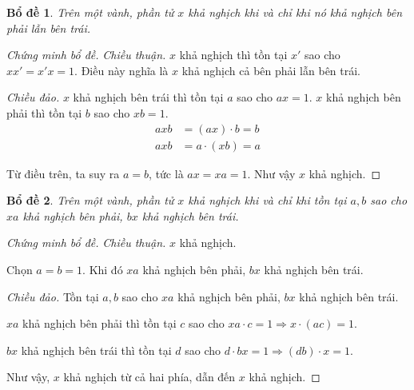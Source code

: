 \documentclass[class=linearalgebra,crop=false]{standalone}
\newtheorem{lemma}{Bổ đề}
\begin{document}
\begin{lemma}Trên một vành, phần tử $x$ khả nghịch khi và chỉ khi nó khả nghịch bên phải lẫn bên trái.
\end{lemma}

\begin{proof}[Chứng minh bổ đề]\textit{Chiều thuận.} $x$ khả nghịch thì tồn tại $x'$ sao cho $xx' = x'x = 1$. Điều này nghĩa là $x$ khả nghịch cả bên phải lẫn bên trái.
    \par\textit{Chiều đảo.} $x$ khả nghịch bên trái thì tồn tại $a$ sao cho $ax = 1$. $x$ khả nghịch bên phải thì tồn tại $b$ sao cho $xb = 1$.
    \begin{align*}
        axb &= (ax)\cdot b = b \\
        axb &= a\cdot (xb) = a
    \end{align*}
    \par Từ điều trên, ta suy ra $a = b$, tức là $ax = xa = 1$. Như vậy $x$ khả nghịch.
\end{proof}

\begin{lemma}Trên một vành, phần tử $x$ khả nghịch khi và chỉ khi tồn tại $a, b$ sao cho $xa$ khả nghịch bên phải, $bx$ khả nghịch bên trái.
\end{lemma}

\begin{proof}[Chứng minh bổ đề]\textit{Chiều thuận.} $x$ khả nghịch.
    \par Chọn $a = b = 1$. Khi đó $xa$ khả nghịch bên phải, $bx$ khả nghịch bên trái.
    \par \textit{Chiều đảo.} Tồn tại $a, b$ sao cho $xa$ khả nghịch bên phải, $bx$ khả nghịch bên trái.
    \par $xa$ khả nghịch bên phải thì tồn tại $c$ sao cho $xa\cdot c = 1\Rightarrow x \cdot (ac) = 1$.
    \par $bx$ khả nghịch bên trái thì tồn tại $d$ sao cho $d\cdot bx = 1\Rightarrow (db)\cdot x = 1$.
    \par Như vậy, $x$ khả nghịch từ cả hai phía, dẫn đến $x$ khả nghịch.
\end{proof}
\end{document}
